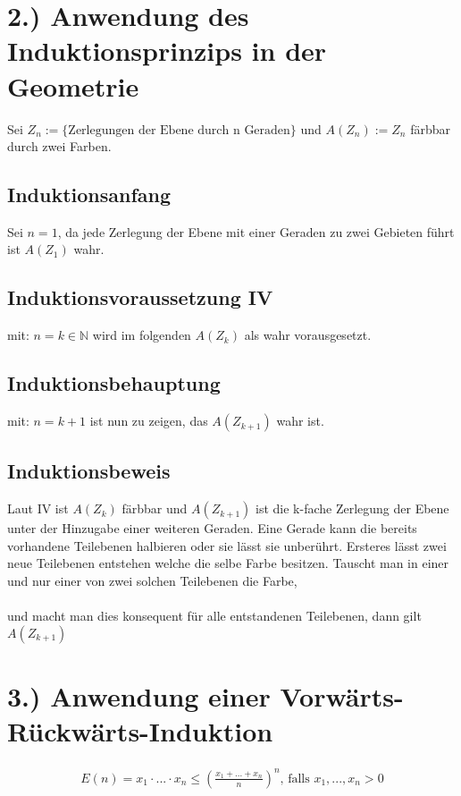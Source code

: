 \documentclass[titlepage]{article}
\newcommand{\N}{\mathbb{N}}
\begin{document}
	\section*{2.) Anwendung des Induktionsprinzips in der Geometrie}
		Sei $Z_n:=\{\text{Zerlegungen der Ebene durch n Geraden}\}$ und $A(Z_n):=Z_n$ färbbar durch zwei Farben.
		\subsection*{Induktionsanfang} Sei $n=1$, da jede Zerlegung der Ebene mit einer Geraden zu zwei Gebieten führt ist $A(Z_1)$ wahr.
		\subsection*{Induktionsvoraussetzung IV}
		mit: $n=k\in\N$ wird im folgenden $A(Z_k)$ als wahr vorausgesetzt.
		\subsection*{Induktionsbehauptung}
		mit: $n=k+1$ ist nun zu zeigen, das $A(Z_{k+1})$ wahr ist.
		\subsection*{Induktionsbeweis}
		Laut IV ist $A(Z_k)$ färbbar und $A(Z_{k+1})$ ist die k-fache Zerlegung der Ebene unter der Hinzugabe einer weiteren Geraden. Eine Gerade kann die bereits vorhandene Teilebenen halbieren oder sie lässt sie unberührt. Ersteres lässt zwei neue Teilebenen entstehen welche die selbe Farbe besitzen. Tauscht man in einer und nur einer von zwei solchen Teilebenen die Farbe, \\\\und macht man dies konsequent für alle entstandenen Teilebenen, dann gilt $A(Z_{k+1})$ \qedsymbol
	\section*{3.) Anwendung einer Vorwärts-Rückwärts-Induktion}
		\begin{align*}
			E(n)=x_1\cdot...\cdot x_n\le\left(\frac{x_1+...+x_n}{n}\right)^n\text{, falls $x_1,...,x_n>0$}
		\end{align*}
\end{document}
